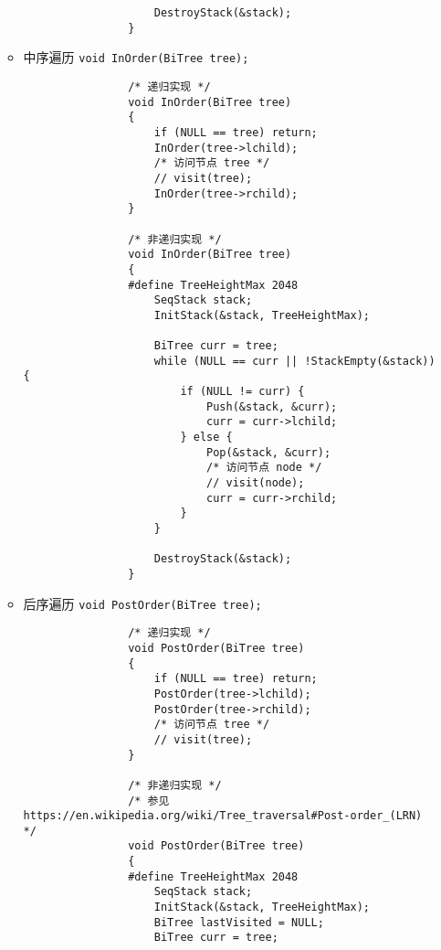 \documentclass{ctexart}
\begin{document}
\begin{enumerate}
\begin{itemize}
\begin{verbatim}
                    DestroyStack(&stack);
                }
            \end{verbatim}

            \item 中序遍历 \texttt{void InOrder(BiTree tree);}
                \begin{verbatim}
                /* 递归实现 */
                void InOrder(BiTree tree)
                {
                    if (NULL == tree) return;
                    InOrder(tree->lchild);
                    /* 访问节点 tree */
                    // visit(tree);
                    InOrder(tree->rchild);
                }

                /* 非递归实现 */
                void InOrder(BiTree tree)
                {
                #define TreeHeightMax 2048
                    SeqStack stack;
                    InitStack(&stack, TreeHeightMax);

                    BiTree curr = tree;
                    while (NULL == curr || !StackEmpty(&stack)) {
                        if (NULL != curr) {
                            Push(&stack, &curr);
                            curr = curr->lchild;
                        } else {
                            Pop(&stack, &curr);
                            /* 访问节点 node */
                            // visit(node);
                            curr = curr->rchild;
                        }
                    }

                    DestroyStack(&stack);
                }
                \end{verbatim}

            \item 后序遍历 \texttt{void PostOrder(BiTree tree);}
                \begin{verbatim}
                /* 递归实现 */
                void PostOrder(BiTree tree)
                {
                    if (NULL == tree) return;
                    PostOrder(tree->lchild);
                    PostOrder(tree->rchild);
                    /* 访问节点 tree */
                    // visit(tree);
                }

                /* 非递归实现 */
                /* 参见 https://en.wikipedia.org/wiki/Tree_traversal#Post-order_(LRN) */
                void PostOrder(BiTree tree)
                {
                #define TreeHeightMax 2048
                    SeqStack stack;
                    InitStack(&stack, TreeHeightMax);
                    BiTree lastVisited = NULL;
                    BiTree curr = tree;


\end{verbatim}
\end{itemize}
\end{enumerate}
\end{document}
